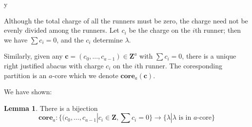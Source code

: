 y\documentclass{amsart}[12pt]
\theoremstyle{definition}
\newtheorem{lemma}[dummy]{Lemma}
\newcommand{\Z}{\mathbf{Z}}
\newcommand{\core}{\mathbf{core}}
\begin{document}
  Although the total charge of all the runners must be zero, the charge need not be evenly divided among the runners.  Let
$c_i$ be the charge on the $i$th runner; then we have $\sum c_i=0$, and the $c_i$ determine $\lambda$.

Similarly, given any $\mathbf{c}=(c_0,\dots,c_{a-1})\in\Z^a$ with $\sum c_i=0$, there is a unique right justified abacus with charge  $c_i$ on the $i$th runner.  The coresponding partition is an $a$-core which we denote $\core_a(\mathbf{c})$.

We have shown:

\begin{lemma}
There is a bijection $$\core_a:\{(c_0,\dots,c_{a-1}|c_i\in\Z, \sum c_i=0\}\to \{\lambda | \lambda \text{ is in $a$-core} \}$$
\end{lemma}
\end{document}
